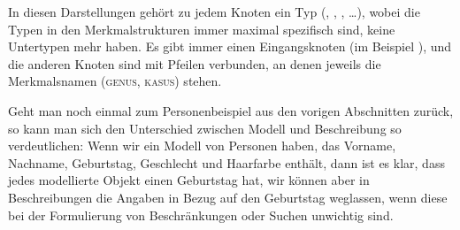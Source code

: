 In diesen Darstellungen gehört zu jedem Knoten ein Typ (, , ,
\ldots), wobei die Typen in den Merkmalstrukturen immer maximal spezifisch sind, \dash keine
Untertypen mehr haben. Es gibt immer einen Eingangsknoten (im Beispiel ), und die anderen
Knoten sind mit Pfeilen verbunden, an denen jeweils die Merkmalsnamen (\textsc{genus}, \textsc{kasus}) stehen.

Geht man noch einmal zum Personenbeispiel aus den vorigen Abschnitten zurück,
so kann man sich den Unterschied zwischen Modell und Beschreibung so verdeutlichen:
Wenn wir ein Modell von Personen haben, das Vorname, Nachname, Geburtstag,
Geschlecht und Haarfarbe enthält, dann ist es klar, dass jedes modellierte Objekt
einen Geburtstag hat, wir können aber in Beschreibungen die Angaben in Bezug
auf den Geburtstag weglassen, wenn diese bei der Formulierung von Beschränkungen
oder Suchen unwichtig sind.

